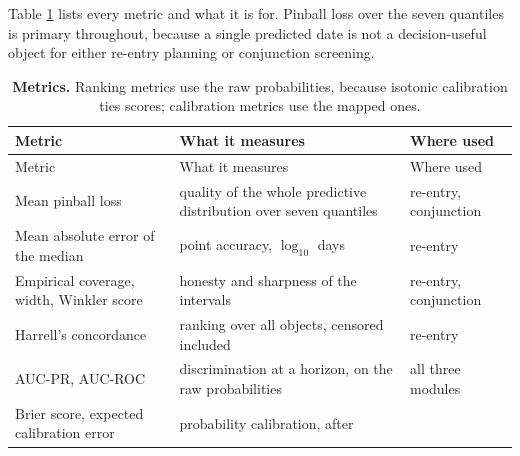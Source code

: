 \documentclass[3p,times]{elsarticle}
\begin{document}
Table \ref{tbl:metrics} lists every metric and what it is for. Pinball
loss over the seven quantiles is primary throughout, because a single
predicted date is not a decision-useful object for either re-entry
planning or conjunction screening.

\begin{longtable}[]{@{}
  >{\raggedright\arraybackslash}p{}
  >{\raggedright\arraybackslash}p{}
  >{\raggedright\arraybackslash}p{}@{}}
\caption{\textbf{Metrics.} Ranking metrics use the raw probabilities,
because isotonic calibration ties scores; calibration metrics use the
mapped ones.}\label{tbl:metrics}\tabularnewline
\toprule\noalign{}
\begin{minipage}[b]{\linewidth}\raggedright
Metric
\end{minipage} & \begin{minipage}[b]{\linewidth}\raggedright
What it measures
\end{minipage} & \begin{minipage}[b]{\linewidth}\raggedright
Where used
\end{minipage} \\
\midrule\noalign{}
\endfirsthead
\toprule\noalign{}
\begin{minipage}[b]{\linewidth}\raggedright
Metric
\end{minipage} & \begin{minipage}[b]{\linewidth}\raggedright
What it measures
\end{minipage} & \begin{minipage}[b]{\linewidth}\raggedright
Where used
\end{minipage} \\
\midrule\noalign{}
\endhead
\bottomrule\noalign{}
\endlastfoot
Mean pinball loss & quality of the whole predictive distribution over
seven quantiles & re-entry, conjunction \\
Mean absolute error of the median & point accuracy, \(\log_{10}\) days &
re-entry \\
Empirical coverage, width, Winkler score & honesty and sharpness of the
intervals & re-entry, conjunction \\
Harrell's concordance & ranking over all objects, censored included &
re-entry \\
AUC-PR, AUC-ROC & discrimination at a horizon, on the raw probabilities
& all three modules \\
Brier score, expected calibration error & probability calibration, after

\end{longtable}
\end{document}
